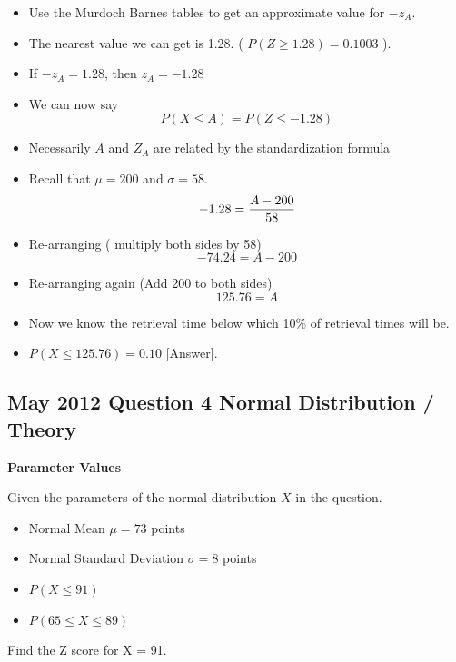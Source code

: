 ﻿\documentclass[]{report}
\begin{document}
	\begin{itemize}
		\item Use the Murdoch Barnes tables to get an approximate value for $-z_A$.
		\item The nearest value we can get is 1.28. ( $P( Z \geq 1.28) = 0.1003$ ).
		\item If $-z_A = 1.28$, then $z_A=-1.28$
		\item We can now say
		\[ P(X \leq A) = P(Z \leq -1.28) \]
		
	\end{itemize}

	\begin{itemize}
		\item Necessarily $A$ and $Z_A$ are related by the standardization formula
		\item Recall that $\mu = 200$ and $\sigma = 58$.
		\[ -1.28  = {A - 200 \over 58} \]
		\item Re-arranging ( multiply both sides by 58)
		\[ -74.24  = A - 200 \]
		\item Re-arranging again (Add 200 to both sides)
		\[ 125.76 =  A \]
	\end{itemize}
	\begin{itemize}
		\item Now we know the retrieval time below which 10\% of retrieval times will be.
		\item $P(X \leq 125.76) = 0.10$ [Answer].
	\end{itemize}






\subsection{May 2012 Question 4 Normal Distribution / Theory}



\noindent \textbf{Parameter Values}

Given the parameters of the normal distribution $X$ in the question.
\begin{itemize}
	\item Normal Mean $\mu = 73$ points
	\item Normal Standard Deviation $\sigma = 8$ points
\end{itemize}

\begin{itemize}
	\item $P(X \leq 91)$
	\item $P(65 \leq X \leq 89)$
\end{itemize}
Find the Z score for X = 91.
\end{document}
